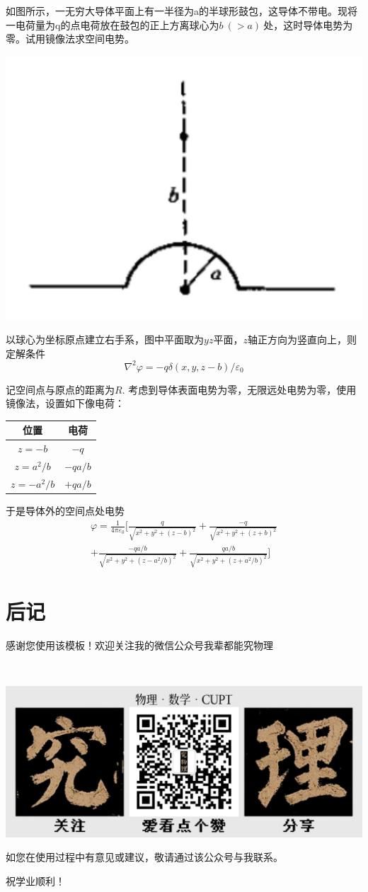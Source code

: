 \documentclass{template}
\begin{document}
\begin{problem}
    如图所示，一无穷大导体平面上有一半径为a的半球形鼓包，这导体不带电。现将一电荷量为q的点电荷放在鼓包的正上方离球心为$b\ (>a)\ $处，这时导体电势为零。试用镜像法求空间电势。\par
    \centering
        \includegraphics[width=0.2\linewidth]{figures/example1.jpg}
\end{problem}
\begin{solution}
    以球心为坐标原点建立右手系，图中平面取为$yz$平面，$z$轴正方向为竖直向上，则定解条件
    \begin{equation}
        \nabla^2\varphi=-q\delta(x,y,z-b)/\varepsilon_0
    \end{equation}
    
    记空间点与原点的距离为$R$. 考虑到导体表面电势为零，无限远处电势为零，使用镜像法，设置如下像电荷：

    \begin{table}[H]
        \centering
        \begin{tabular}{|c|c|}
            \hline
            位置& 电荷 \\ \hline
            $z=-b$ & $-q$ \\ \hline
            $z=a^2/b$ & $-qa/b$ \\ \hline
            $z=-a^2/b$ & $+qa/b$ \\ \hline
        \end{tabular}
        \label{tab:example_2x3}
    \end{table}
    于是导体外的空间点处电势
    \begin{align}
        \varphi=\frac{1}{4\pi\varepsilon_0}[\frac{q}{\sqrt{x^2+y^2+(z-b)^2}}+\frac{-q}{\sqrt{x^2+y^2+(z+b)^2}}\nonumber\\ +\frac{-qa/b}{\sqrt{x^2+y^2+(z-a^2/b)^2}}+\frac{qa/b}{\sqrt{x^2+y^2+(z+a^2/b)^2}}]
    \end{align}
\end{solution}
\chapter{后记}
感谢您使用该模板！欢迎关注我的微信公众号\heiti 我辈都能究物理\songti

\ 

\begin{center}
     \includegraphics[width=0.9\linewidth]{figures/mychannel.jpg}
\end{center}

如您在使用过程中有意见或建议，敬请通过该公众号与我联系。

祝学业顺利！
\end{document}
